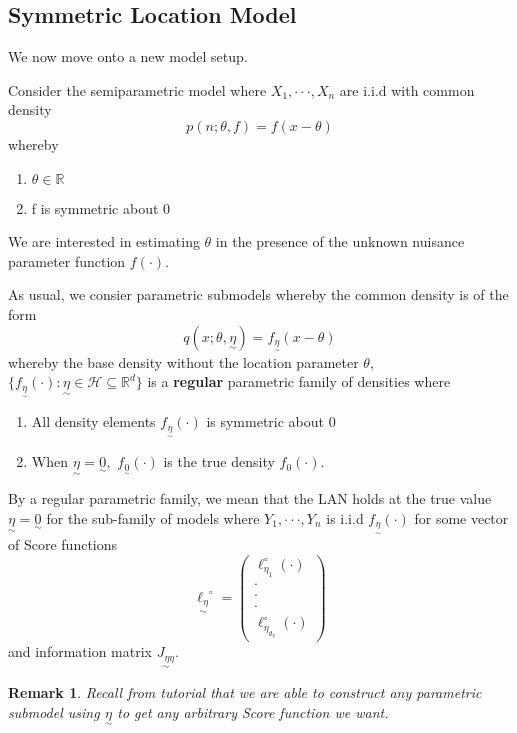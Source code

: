 \documentclass[twoside]{article}
\newtheorem{remark}[theorem]{Remark}
\newcommand{\real}{\mathbb{R}}
\newcommand{\utilde}{\underset{\sim}}
\begin{document}
\subsection{Symmetric Location Model}

We now move onto a new model setup. 

Consider the semiparametric model where $X_1, \cdot \cdot \cdot, X_n$ are i.i.d with common density 
$$
p(n; \theta, f) = f(x - \theta)
$$
whereby 
\begin{enumerate}
  \item $\theta \in \real$
  \item f is symmetric about 0
\end{enumerate}

We are interested in estimating $\theta$ in the presence of the unknown nuisance parameter function $f(\cdot).$ 

As usual, we consier parametric submodels whereby the common density is of the form 
$$
q(x; \theta, \utilde{\eta}) = f_{\utilde{\eta}}(x - \theta)
$$
whereby the base density without the location parameter $\theta$, $\{f_{\utilde{\eta}}(\cdot): \utilde{\eta} \in \mathcal{H} \subseteq \real^d\}$ is a \textbf{regular} parametric family of densities where 
\begin{enumerate}
  \item All density elements $f_{\utilde{\eta}}(\cdot)$ is symmetric about 0 
  \item When $\utilde{\eta} = \utilde{0},$ $f_{\utilde{0}}(\cdot)$ is the true density $f_0(\cdot).$
\end{enumerate}

By a regular parametric family, we mean that the LAN holds at the true value $\utilde{\eta} = \utilde{0}$ for the sub-family of models where $Y_1, \cdot \cdot \cdot, Y_n$ is i.i.d $f_{\utilde{\eta}}(\cdot)$ for some vector of Score functions 
$$
\utilde{\ell_{\eta}}^{\circ} = 
\begin{pmatrix}
  \ell_{\eta_{1}}^{\circ}(\cdot)\\
  \cdot \\
  \cdot \\
  \cdot \\
  \ell_{\eta_{d_{\eta}}}^{\circ}(\cdot)
\end{pmatrix}
$$
and information matrix $\utilde{J_{\eta \eta}}.$

\begin{remark} Recall from tutorial that we are able to construct any parametric submodel using $\utilde{\eta}$ to get any arbitrary Score function we want.
\end{remark}
\end{document}
